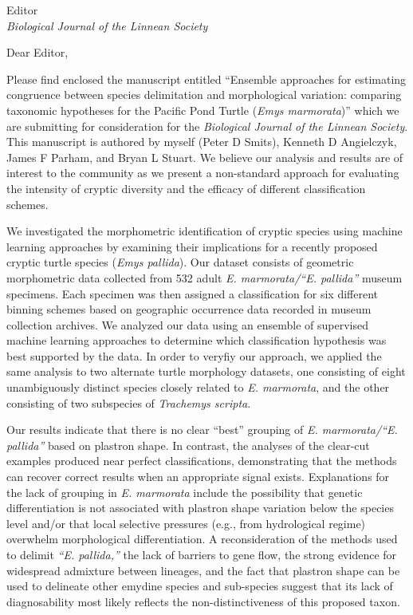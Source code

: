 \documentclass{letter}
\begin{document}
\begin{letter}{Editor \\ \textit{Biological Journal of the Linnean Society}}
  \opening{Dear Editor,}

  Please find enclosed the manuscript entitled ``Ensemble approaches for estimating congruence between species delimitation and morphological variation: comparing taxonomic hypotheses for the Pacific Pond Turtle (\textit{Emys marmorata})'' which we are submitting for consideration for the \textit{Biological Journal of the Linnean Society}. This manuscript is authored by myself (Peter D Smits), Kenneth D Angielczyk, James F Parham, and Bryan L Stuart. We believe our analysis and results are of interest to the community as we present a non-standard approach for evaluating the intensity of cryptic diversity and the efficacy of different classification schemes.

  We investigated the morphometric identification of cryptic species using machine learning approaches by examining their implications for a recently proposed cryptic turtle species (\textit{Emys pallida}). Our dataset consists of geometric morphometric data collected from  532 adult \textit{E. marmorata/``E. pallida''} museum specimens. Each specimen was then assigned a classification for six different binning schemes based on geographic occurrence data recorded in museum collection archives. We analyzed our data using an ensemble of supervised machine learning approaches to determine which classification hypothesis was best supported by the data. In order to veryfiy our approach, we applied the same analysis to two alternate turtle morphology datasets, one consisting of eight unambiguously distinct species closely related to \textit{E. marmorata}, and the other consisting of two subspecies of \textit{Trachemys scripta}. 
  
  Our results indicate that there is no clear ``best'' grouping of \textit{E. marmorata/``E. pallida''} based on plastron shape. In contrast, the analyses of the clear-cut examples produced near perfect classifications, demonstrating that the methods can recover correct results when an appropriate signal exists. Explanations for the lack of grouping in \textit{E. marmorata} include the possibility that genetic differentiation is not associated with plastron shape variation below the species level and/or that local selective pressures (e.g., from hydrological regime) overwhelm morphological differentiation. A reconsideration of the methods used to delimit \textit{``E. pallida,''} the lack of barriers to gene flow, the strong evidence for widespread admixture between lineages, and the fact that plastron shape can be used to delineate other emydine species and sub-species suggest that its lack of diagnosability most likely reflects the non-distinctiveness of this proposed taxon. 


\end{letter}
\end{document}
